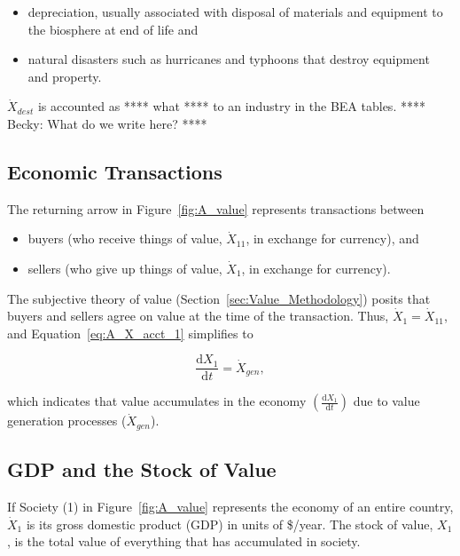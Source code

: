 \begin{itemize}
	\item{depreciation, usually associated with disposal of 
	materials and equipment to the biosphere at end of life and}
	\item{natural disasters such as hurricanes and typhoons
	that destroy equipment and property.}
\end{itemize}

$\dot{X}_{dest}$ is accounted as **** what **** to an industry in the BEA tables.
**** Becky: What do we write here? ****


\subsection{Economic Transactions}

The returning arrow in Figure~\ref{fig:A_value} 
represents transactions between 
\begin{itemize}
	\item{buyers (who receive things of value, $\dot{X}_{11}$,
	in exchange for currency), and}
	\item{sellers (who give up things of value, $\dot{X}_{1}$,
	in exchange for currency).}
\end{itemize}

The subjective theory of value
(Section~\ref{sec:Value_Methodology})
posits that buyers and sellers agree on value at the 
time of the transaction.
Thus, $\dot{X}_{1} = \dot{X}_{11}$, and Equation~\ref{eq:A_X_acct_1}
simplifies to

\begin{equation} \label{eq:A_X_acct_2}	
	\frac{\mathrm{d}X_{1}}{\mathrm{d}t}	
	= \dot{X}_{gen},
\end{equation}

\noindent which indicates that value accumulates in the economy
$\left( \frac{\mathrm{d}X_{1}}{\mathrm{d}t} \right)$
due to value generation processes ($\dot{X}_{gen}$).


\subsection{GDP and the Stock of Value}

If Society (1) in Figure~\ref{fig:A_value} represents 
the economy of an entire country, 
$\dot{X}_{1}$ is its gross domestic product (GDP)
in units of \$/year.
The stock of value, $X_1$, is the total value of everything that 
has accumulated in society.

